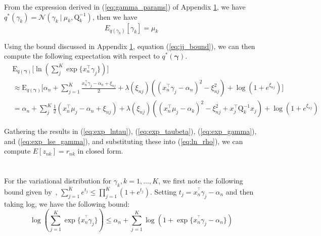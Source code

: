 \documentclass[twoside,11pt]{article}
\newcommand{\tr}{\intercal}
\newcommand\given[1][]{\:#1\vert\:}
\begin{document}
From the expression derived in (\ref{eq:gamma_params}) of Appendix \ref{app:gamma}, we have $q^{*}(\gamma_k) = \mathcal{N}(\gamma_k \given \mu_k, \mathrm{Q}_k^{-1})$, then we have
\begin{equation} \label{eq:exp_gamma}
	E_{q(\gamma_k)}[\gamma_k] = \mu_k
\end{equation}

Using the bound discussed in Appendix \ref{app:gamma}, equation (\ref{eq:jj_bound}), we can then compute the following expectation with respect to $q^{*}(\boldsymbol\gamma)$.
\begin{equation} \label{eq:exp_lse_gamma}
\begin{split}
	& \mathrm{E}_{q(\boldsymbol\gamma)} \Bigg[ \ln \left( \sum_{j}^K \exp \{ x_n^{\tr} \gamma_j \}\right) \Bigg] \\
	& \approx \mathrm{E}_{q(\boldsymbol\gamma)} \Bigg[ \alpha_n + \sum_{j = 1}^K \frac{x_n^{\intercal} \gamma_j - \alpha_n + \xi_{nj}}{2} + \lambda(\xi_{nj}) \left( (x_n^{\intercal} \gamma_j - \alpha_n)^2 - \xi_{nj}^2\right) + \log \left( 1 + e^{\xi_{nj}}\right) \Bigg] \\
	& = \alpha_n + \sum_{j}^K \frac{1}{2}\left(x_n^{\tr}\mu_j - \alpha_n + \xi_{nj}\right) + \lambda(\xi_{nj}) \left( (x_n^{\tr} \mu_j - \alpha_k)^2 - \xi_{nj}^2 + x_j^{\tr} \mathrm{Q}_k^{-1} x_j \right) + \log( 1 + e^{\xi_{nj}})
\end{split}
\end{equation}

Gathering the results in (\ref{eq:exp_lntau}), (\ref{eq:exp_taubeta}), (\ref{eq:exp_gamma}), and (\ref{eq:exp_lse_gamma}), and substituting these into (\ref{eq:ln_rho}), we can compute $E[z_{nk}] = r_{nk}$ in closed form. 



\section{ } \label{app:gamma}  



For the variational distribution for $\gamma_k, k = 1, \ldots, K$, we first note the following bound given by~\cite{bouchard:07}, $\sum_{j = 1}^{K} e^{t_j} \leq \prod_{j = 1}^K (1 + e^{t_j})$. Setting $t_j = x_n^{^\intercal} \gamma_j - \alpha_{n}$ and then taking log, we have the following bound:
\begin{equation} \label{eq:log-sum-exp}
	\log \left( \sum_{j = 1}^K \exp\{ x_n^{^\intercal} \gamma_j \}\right) \leq \alpha_n + \sum_{j=1}^K \log \left( 1 + \exp \{ x_n^{^\intercal} \gamma_j - \alpha_n \}\right)
\end{equation}
\end{document}

